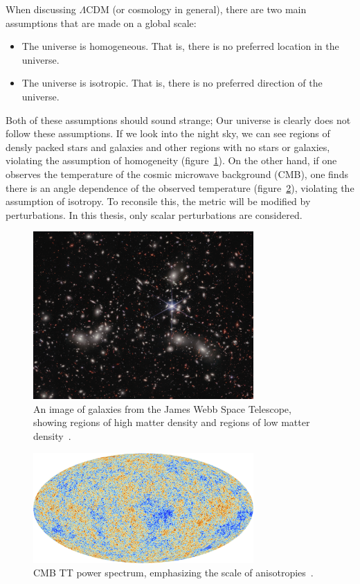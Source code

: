 When discussing $\Lambda$CDM (or cosmology in general), there are two main assumptions that are made on a global scale:
\begin{itemize}
    \item The universe is homogeneous. That is, there is no preferred location in the universe.
    \item The universe is isotropic. That is, there is no preferred direction of the universe.
\end{itemize}
Both of these assumptions should sound strange; Our universe is clearly does not follow these assumptions. If we look into the night sky, we can see regions of densly packed stars and galaxies and other regions with no stars or galaxies, violating the assumption of homogeneity (figure~\ref{fig:galaxy_map}). On the other hand, if one observes the temperature of the cosmic microwave background (CMB), one finds there is an angle dependence of the observed temperature (figure~\ref{fig:cmb_tt_map}), violating the assumption of isotropy. To reconsile this, the metric will be modified by perturbations. In this thesis, only scalar perturbations are considered.
\begin{figure}[ht]
    \centering
    \includegraphics[width=0.75\textwidth]{plots/weic2305a.jpg}
    \caption{An image of galaxies from the James Webb Space Telescope, showing regions of high matter density and regions of low matter density~\cite{webb_clusters}.}
    \label{fig:galaxy_map}
\end{figure}
\begin{figure}[ht]
    \centering
    \includegraphics[width=0.75\textwidth]{plots/Planck_CMB.jpg}
    \caption{CMB TT power spectrum, emphasizing the scale of anisotropies~\cite{planck_CMB}.}
    \label{fig:cmb_tt_map}
\end{figure}


